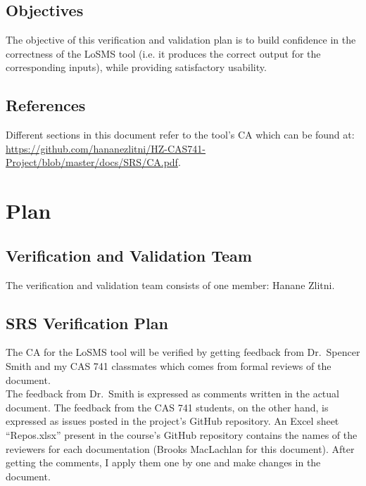 \documentclass[12pt, titlepage]{article}
\newcommand{\famname}{LoSMS}
\begin{document}
\subsection{Objectives}

The objective of this verification and validation plan is to build confidence 
in the correctness of the \famname{} tool (i.e. it produces the correct output 
for the corresponding inputs), while providing satisfactory usability.

\subsection{References}

Different sections in this document refer to the tool's CA which can be found 
at: 
\url{https://github.com/hananezlitni/HZ-CAS741-Project/blob/master/docs/SRS/CA.pdf}.

\section{Plan} \label{Plan}
	
\subsection{Verification and Validation Team}

The verification and validation team consists of one member: Hanane Zlitni.

\subsection{SRS Verification Plan}

The CA for the \famname{} tool will be verified by getting feedback from 
Dr.~Spencer Smith  and my CAS 741 classmates which comes from formal 
reviews of the document. \\

The feedback from Dr.~Smith is expressed as comments written in the actual 
document. The feedback from the CAS 741 students, on the other hand, is 
expressed as issues posted in the project's GitHub repository. An Excel sheet 
``Repos.xlsx'' present in the course's GitHub repository contains the names of 
the reviewers for each documentation (Brooks MacLachlan for this document). 
After getting the comments, I apply them one by one and make changes in the 
document. 
\end{document}

